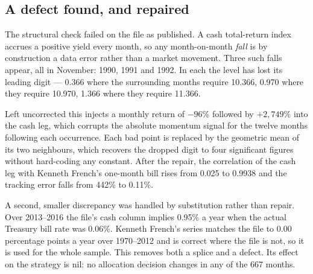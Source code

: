 \documentclass[11pt,a4paper]{article}
\begin{document}
\subsection*{A defect found, and repaired}

The structural check failed on the file as published. A cash total-return index
accrues a positive yield every month, so any month-on-month \emph{fall} is by
construction a data error rather than a market movement. Three such falls
appear, all in November: 1990, 1991 and 1992. In each the level has lost its
leading digit --- 0.366 where the surrounding months require 10.366, 0.970
where they require 10.970, 1.366 where they require 11.366.

Left uncorrected this injects a monthly return of $-96$\% followed by
$+2{,}749$\% into the cash leg, which corrupts the absolute momentum signal for
the twelve months following each occurrence. Each bad point is replaced by the
geometric mean of its two neighbours, which recovers the dropped digit to four
significant figures without hard-coding any constant. After the repair, the
correlation of the cash leg with Kenneth French's one-month bill rises from
0.025 to 0.9938 and the tracking error falls from 442\% to 0.11\%.

A second, smaller discrepancy was handled by substitution rather than repair.
Over 2013--2016 the file's cash column implies 0.95\% a year when the actual
Treasury bill rate was 0.06\%. Kenneth French's series matches the file to 0.00
percentage points a year over 1970--2012 and is correct where the file is not,
so it is used for the whole sample. This removes both a splice and a defect. Its
effect on the strategy is nil: no allocation decision changes in any of the 667
months.
\end{document}

